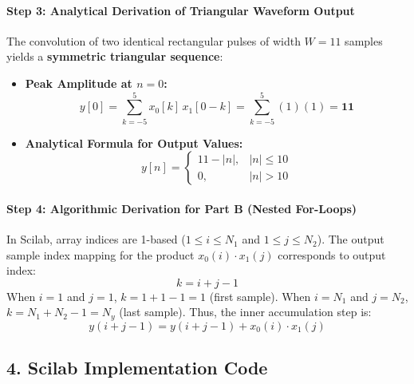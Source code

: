 \documentclass[11pt,a4paper]{article}
\begin{document}
\paragraph{Step 3: Analytical Derivation of Triangular Waveform Output}
The convolution of two identical rectangular pulses of width $W = 11$ samples yields a \textbf{symmetric triangular sequence}:
\begin{itemize}
    \item \textbf{Peak Amplitude at $n = 0$:}
    \begin{equation}
        y[0] = \sum_{k=-5}^{5} x_0[k]\,x_1[0 - k] = \sum_{k=-5}^{5} (1)(1) = \mathbf{11}
    \end{equation}
    \item \textbf{Analytical Formula for Output Values:}
    \begin{equation}
        y[n] = 
        \begin{cases} 
            11 - |n|, & |n| \le 10 \\ 
            0, & |n| > 10 
        \end{cases}
    \end{equation}
\end{itemize}

\paragraph{Step 4: Algorithmic Derivation for Part B (Nested For-Loops)}
In Scilab, array indices are 1-based ($1 \le i \le N_1$ and $1 \le j \le N_2$).
The output sample index mapping for the product $x_0(i) \cdot x_1(j)$ corresponds to output index:
\begin{equation}
    k = i + j - 1
\end{equation}
When $i=1$ and $j=1$, $k = 1 + 1 - 1 = 1$ (first sample). When $i=N_1$ and $j=N_2$, $k = N_1 + N_2 - 1 = N_y$ (last sample).
Thus, the inner accumulation step is:
\begin{equation}
    y(i + j - 1) = y(i + j - 1) + x_0(i) \cdot x_1(j)
\end{equation}

\subsection*{4. Scilab Implementation Code}
\end{document}

